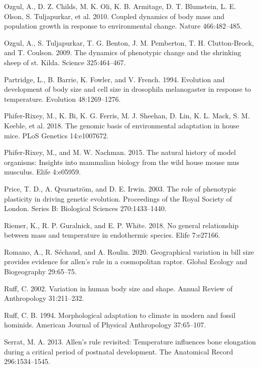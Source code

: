 \documentclass[]{article}
\begin{document}
\leavevmode\hypertarget{ref-Ozgul2010}{}%
Ozgul, A., D. Z. Childs, M. K. Oli, K. B. Armitage, D. T. Blumstein, L.
E. Olson, S. Tuljapurkar, et al. 2010. Coupled dynamics of body mass and
population growth in response to environmental change. Nature
466:482--485.

\leavevmode\hypertarget{ref-Ozgul2009}{}%
Ozgul, A., S. Tuljapurkar, T. G. Benton, J. M. Pemberton, T. H.
Clutton-Brock, and T. Coulson. 2009. The dynamics of phenotypic change
and the shrinking sheep of st. Kilda. Science 325:464--467.

\leavevmode\hypertarget{ref-Partridge1994}{}%
Partridge, L., B. Barrie, K. Fowler, and V. French. 1994. Evolution and
development of body size and cell size in drosophila melanogaster in
response to temperature. Evolution 48:1269--1276.

\leavevmode\hypertarget{ref-Phifer-Rixey2018}{}%
Phifer-Rixey, M., K. Bi, K. G. Ferris, M. J. Sheehan, D. Lin, K. L.
Mack, S. M. Keeble, et al. 2018. The genomic basis of environmental
adaptation in house mice. PLoS Genetics 14:e1007672.

\leavevmode\hypertarget{ref-Phifer-Rixey2015}{}%
Phifer-Rixey, M., and M. W. Nachman. 2015. The natural history of model
organisms: Insights into mammalian biology from the wild house mouse mus
musculus. Elife 4:e05959.

\leavevmode\hypertarget{ref-Price2003}{}%
Price, T. D., A. Qvarnström, and D. E. Irwin. 2003. The role of
phenotypic plasticity in driving genetic evolution. Proceedings of the
Royal Society of London. Series B: Biological Sciences 270:1433--1440.

\leavevmode\hypertarget{ref-Riemer2018}{}%
Riemer, K., R. P. Guralnick, and E. P. White. 2018. No general
relationship between mass and temperature in endothermic species. Elife
7:e27166.

\leavevmode\hypertarget{ref-Romano2020}{}%
Romano, A., R. Séchaud, and A. Roulin. 2020. Geographical variation in
bill size provides evidence for allen's rule in a cosmopolitan raptor.
Global Ecology and Biogeography 29:65--75.

\leavevmode\hypertarget{ref-Ruff2002}{}%
Ruff, C. 2002. Variation in human body size and shape. Annual Review of
Anthropology 31:211--232.

\leavevmode\hypertarget{ref-Ruff1994}{}%
Ruff, C. B. 1994. Morphological adaptation to climate in modern and
fossil hominids. American Journal of Physical Anthropology 37:65--107.

\leavevmode\hypertarget{ref-Serrat2013}{}%
Serrat, M. A. 2013. Allen's rule revisited: Temperature influences bone
elongation during a critical period of postnatal development. The
Anatomical Record 296:1534--1545.
\end{document}
